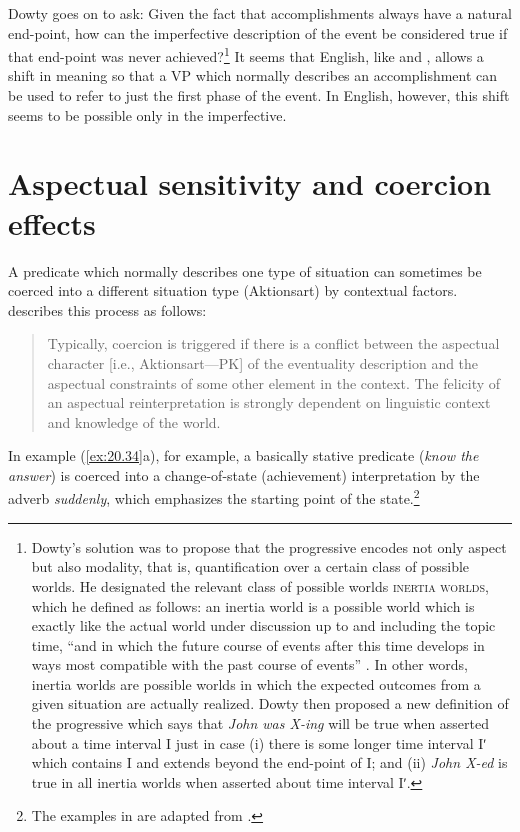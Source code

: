 Dowty goes on to ask: Given the fact that accomplishments always have a natural end-point, how can the imperfective description of the event be considered true if that end-point was never achieved?\footnote{Dowty’s solution was to propose that the progressive encodes not only aspect but also modality, that is, quantification over a certain class of possible worlds. He designated the relevant class of possible worlds \textsc{inertia worlds}, which he defined as follows: an inertia world is a possible world which is exactly like the actual world under discussion up to and including the topic time, “and in which the future course of events after this time develops in ways most compatible with the past course of events” \citep[148]{Dowty1979}. In other words, inertia worlds are possible worlds in which the expected outcomes from a given situation are actually realized. Dowty then proposed a new definition of the progressive which says that \textit{John was X-ing} will be true when asserted about a time interval I just in case (i) there is some longer time interval Iʹ which contains I and extends beyond the end-point of I; and (ii) \textit{John X-ed} is true in all inertia worlds when asserted about time interval Iʹ.} It seems that English, like  and , allows a shift in meaning so that a VP which normally describes an accomplishment can be used to refer to just the first phase of the event. In English, however, this shift seems to be possible only in the imperfective.


\section{Aspectual sensitivity and coercion effects}\label{sec:20.6}

A predicate which normally describes one type of situation can sometimes be coerced into a different situation type (Aktionsart) by contextual factors.   describes this process as follows:


\begin{quote}
Typically, coercion is triggered if there is a conflict between the aspectual character [i.e., Aktionsart—PK] of the eventuality description and the aspectual constraints of some other element in the context. The felicity of an aspectual reinterpretation is strongly dependent on linguistic context and knowledge of the world.
\end{quote}


In example (\ref{ex:20.34}a), for example, a basically stative predicate (\textit{know the answer}) is coerced into a change-of-state (achievement) interpretation by the adverb \textit{suddenly}, which emphasizes the starting point of the state.\footnote{The examples in  are adapted from \citet[359]{deSwart1998}.}


